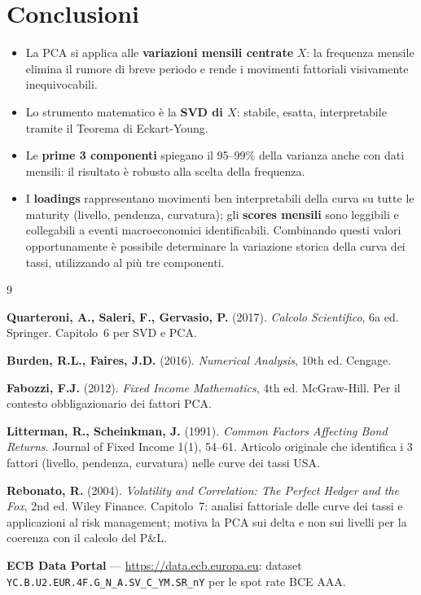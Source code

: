 \documentclass[11pt,a4paper]{article}
\theoremstyle{plain}
\theoremstyle{definition}
\theoremstyle{remark}
\begin{document}
\section{Conclusioni}

\begin{itemize}
  \item La PCA si applica alle \textbf{variazioni mensili centrate} $X$: la
        frequenza mensile elimina il rumore di breve periodo e rende i
        movimenti fattoriali visivamente inequivocabili.
  \item Lo strumento matematico \`e la \textbf{SVD di $X$}: stabile, esatta,
        interpretabile tramite il Teorema di Eckart-Young.
  \item Le \textbf{prime 3 componenti} spiegano il 95--99\% della varianza
        anche con dati mensili: il risultato \`e robusto alla scelta della
        frequenza.
  \item I \textbf{loadings} rappresentano movimenti ben interpretabili della curva su tutte le maturity (livello, pendenza, curvatura); gli \textbf{scores mensili} sono leggibili e
        collegabili a eventi macroeconomici identificabili. Combinando questi valori opportunamente è possibile determinare la variazione storica della curva dei tassi, utilizzando al più tre componenti.
\end{itemize}

\renewcommand{\refname}{Riferimenti bibliografici}
\begin{thebibliography}{9}

  \textbf{Quarteroni, A., Saleri, F., Gervasio, P.} (2017).
  \textit{Calcolo Scientifico}, 6a ed. Springer.
  Capitolo~6 per SVD e PCA.

  \textbf{Burden, R.L., Faires, J.D.} (2016).
  \textit{Numerical Analysis}, 10th ed. Cengage.

  \textbf{Fabozzi, F.J.} (2012).
  \textit{Fixed Income Mathematics}, 4th ed. McGraw-Hill.
  Per il contesto obbligazionario dei fattori PCA.

  \textbf{Litterman, R., Scheinkman, J.} (1991).
  \textit{Common Factors Affecting Bond Returns}.
  Journal of Fixed Income 1(1), 54--61.
  Articolo originale che identifica i 3 fattori (livello, pendenza, curvatura)
  nelle curve dei tassi USA.

  \textbf{Rebonato, R.} (2004).
  \textit{Volatility and Correlation: The Perfect Hedger and the Fox},
  2nd ed. Wiley Finance.
  Capitolo~7: analisi fattoriale delle curve dei tassi e applicazioni al
  risk management; motiva la PCA sui delta e non sui livelli per la
  coerenza con il calcolo del P\&L.

  \textbf{ECB Data Portal} --- \url{https://data.ecb.europa.eu}:
  dataset \texttt{YC.B.U2.EUR.4F.G\_N\_A.SV\_C\_YM.SR\_nY}
  per le spot rate BCE AAA.

\end{thebibliography}
\end{document}
